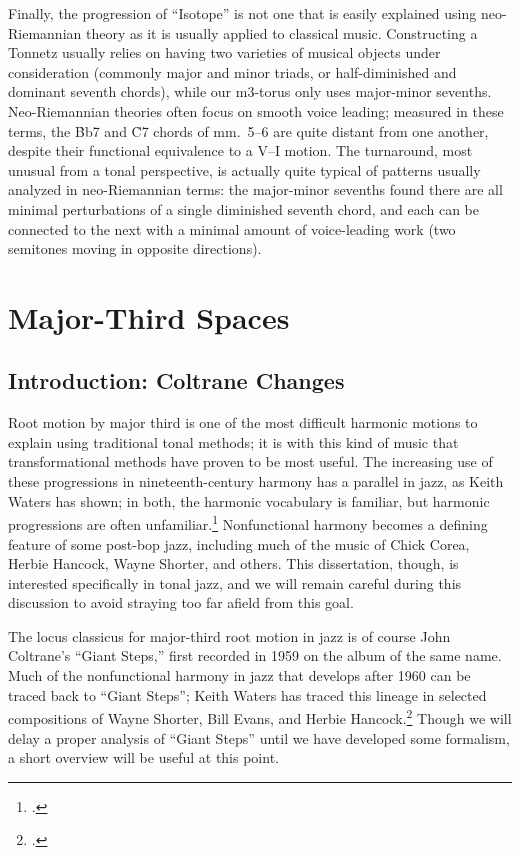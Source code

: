 Finally, the progression of ``Isotope'' is not one that is easily explained
using neo-Riemannian theory as it is usually applied to classical music.
Constructing a Tonnetz usually relies on having two varieties of musical objects
under consideration (commonly major and minor triads, or half-diminished and
dominant seventh chords), while our m3-torus only uses major-minor sevenths.
Neo-Riemannian theories often focus on smooth voice leading; measured in these
terms, the \h{Bb7} and \h{C7} chords of mm.~5--6 are quite distant from one
another, despite their functional equivalence to a V--I motion. The
turnaround, most unusual from a tonal perspective, is actually quite typical
of patterns usually analyzed in neo-Riemannian terms: the major-minor sevenths
found there are all minimal perturbations of a single diminished seventh
chord, and each can be connected to the next with a minimal amount of
voice-leading work (two semitones moving in opposite directions).

\section{Major-Third Spaces}
\label{sec:maj3-spaces}

\subsection{Introduction: Coltrane Changes}
\label{subsec:maj3-intro}

Root motion by major third is one of the most difficult harmonic motions to
explain using traditional tonal methods; it is with this kind of music that
transformational methods have proven to be most useful. The
increasing use of these progressions in nineteenth-century harmony has a
parallel in jazz, as Keith Waters has shown; in both, the harmonic vocabulary
is familiar, but harmonic progressions are often
unfamiliar.\footcite{waters:2013} Nonfunctional harmony becomes a defining
feature of some post-bop jazz, including much of the music of Chick Corea,
Herbie Hancock, Wayne Shorter, and others. This dissertation,
though, is interested specifically in tonal jazz, and we will remain careful
during this discussion to avoid straying too far afield from this goal.

The locus classicus for major-third root motion in jazz is of course John
Coltrane's ``Giant Steps,'' first recorded in 1959 on the album of the same
name. Much of the nonfunctional harmony in jazz that develops after
1960 can be traced back to ``Giant Steps''; Keith Waters has traced this
lineage in selected compositions of Wayne Shorter, Bill Evans, and Herbie
Hancock.\footcite{waters:2010} Though we will delay a proper analysis of
``Giant Steps'' until we have developed some formalism, a short overview will
be useful at this point.

